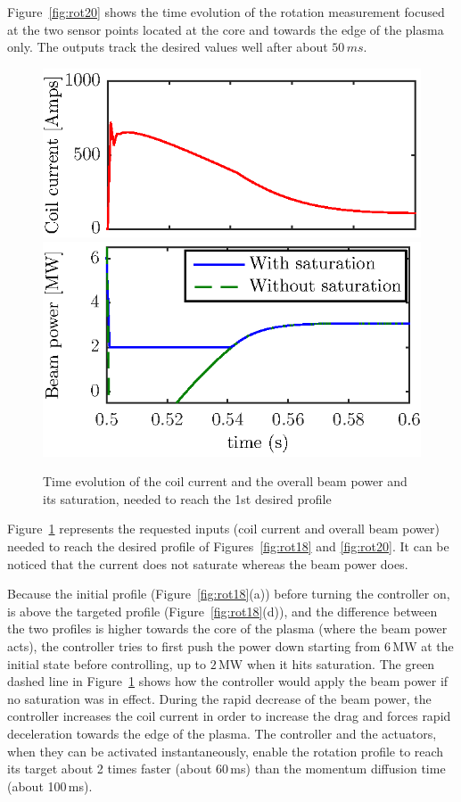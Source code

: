 \documentclass[12pt,lot, lof]{puthesis}
\begin{document}
Figure~\ref{fig:rot20} shows the time evolution of the rotation measurement focused at the two sensor points located at the core and towards the edge of the plasma only. The outputs track the desired values well after about $50\,ms$. 
\begin{figure}
	\centering
	\includegraphics[width=0.7 \linewidth]{fig15a} 
	\includegraphics[width=0.7 \linewidth]{fig15b} 
	\caption{Time evolution of the coil current and the overall beam power and its saturation, needed to reach the 1st desired profile }
	\label{fig:rot19}
\end{figure} 

Figure~\ref{fig:rot19} represents the requested inputs (coil current and overall beam power) needed to reach the desired profile of Figures~\ref{fig:rot18} and \ref{fig:rot20}. It can be noticed that the current does not saturate whereas the beam power does.

Because the initial profile (Figure~\ref{fig:rot18}(a)) before turning the controller on, is above the targeted profile  (Figure~\ref{fig:rot18}(d)), and the difference between the two profiles is higher towards the core of the plasma (where the beam power acts), the controller tries to first push the power down starting from $6$\,MW at the initial state before controlling, up to $2$\,MW when it hits saturation. The green dashed line in Figure~\ref{fig:rot19} shows how the controller would apply the beam power if no saturation was in effect. During the rapid decrease of the beam power, the controller increases the coil current in order to increase the drag and forces rapid deceleration towards the edge of the plasma.  
The controller and the actuators, when they can be activated instantaneously, enable the rotation profile to reach its target about 2 times faster (about 60\,ms) than the momentum diffusion time (about 100\,ms).
\end{document}
